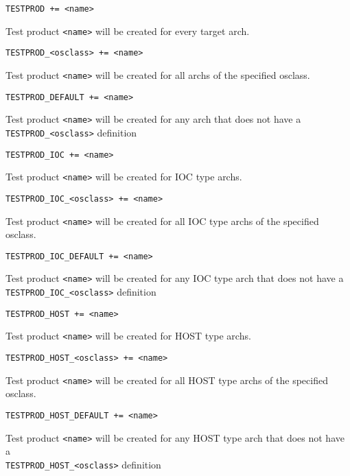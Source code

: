 \begin{description}

\item {}\verb|TESTPROD += <name>|

Test product \verb|<name>| will be created for every target arch.

\item \verb|TESTPROD_<osclass> += <name>|

Test product \verb|<name>| will be created for all archs of the specified osclass.

\item \verb|TESTPROD_DEFAULT += <name>|

Test product \verb|<name>| will be created for any arch that does not have a \\
\verb|TESTPROD_<osclass>| definition

\item

\item {}\verb|TESTPROD_IOC += <name>|

Test product \verb|<name>| will be created for IOC type archs.

\item \verb|TESTPROD_IOC_<osclass> += <name>|

Test product \verb|<name>| will be created for all IOC type archs of the specified osclass.

\item \verb|TESTPROD_IOC_DEFAULT += <name>|

Test product \verb|<name>| will be created for any IOC type arch that does not have a \\
\verb|TESTPROD_IOC_<osclass>| definition

\item

\item {}\verb|TESTPROD_HOST += <name>|

Test product \verb|<name>| will be created for HOST type archs.

\item \verb|TESTPROD_HOST_<osclass> += <name>|

Test product \verb|<name>| will be created for all HOST type archs of the specified osclass.

\item \verb|TESTPROD_HOST_DEFAULT += <name>|

Test product \verb|<name>| will be created for any HOST type arch that does not have a \\
\verb|TESTPROD_HOST_<osclass>| definition

\end{description}

